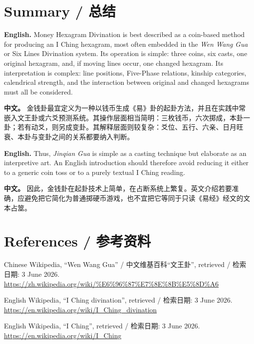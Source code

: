 \documentclass[11pt]{article}
\newcommand{\EN}[1]{\textcolor{labelgray}{\textbf{English.}} #1}
\newcommand{\CN}[1]{\textcolor{labelgray}{\textbf{中文。}} #1}
\newcommand{\bipar}[2]{\EN{#1}\par\CN{#2}\par\medskip}
\begin{document}
\section{Summary / 总结}
\bipar{Money Hexagram Divination is best described as a coin-based method for producing an I Ching hexagram, most often embedded in the \textit{Wen Wang Gua} or Six Lines Divination system. Its operation is simple: three coins, six casts, one original hexagram, and, if moving lines occur, one changed hexagram. Its interpretation is complex: line positions, Five-Phase relations, kinship categories, calendrical strength, and the interaction between original and changed hexagrams must all be considered.}{金钱卦最宜定义为一种以钱币生成《易》卦的起卦方法，并且在实践中常嵌入文王卦或六爻预测系统。其操作层面相当简明：三枚钱币，六次掷成，本卦一卦；若有动爻，则另成变卦。其解释层面则较复杂：爻位、五行、六亲、日月旺衰、本卦与变卦之间的关系都要纳入判断。}
\bipar{Thus, \textit{Jinqian Gua} is simple as a casting technique but elaborate as an interpretive art. An English introduction should therefore avoid reducing it either to a generic coin toss or to a purely textual I Ching reading.}{因此，金钱卦在起卦技术上简单，在占断系统上繁复。英文介绍若要准确，应避免把它简化为普通掷硬币游戏，也不宜把它等同于只读《易经》经文的文本占筮。}

\section*{References / 参考资料}
\begin{enumerate}[label={[\arabic*]}]
\item Chinese Wikipedia, ``Wen Wang Gua'' / 中文维基百科“文王卦”, retrieved / 检索日期: 3 June 2026. \url{https://zh.wikipedia.org/wiki/%E6%96%87%E7%8E%8B%E5%8D%A6}
\item English Wikipedia, ``I Ching divination'', retrieved / 检索日期: 3 June 2026. \url{https://en.wikipedia.org/wiki/I_Ching_divination}
\item English Wikipedia, ``I Ching'', retrieved / 检索日期: 3 June 2026. \url{https://en.wikipedia.org/wiki/I_Ching}
\end{enumerate}
\end{document}
